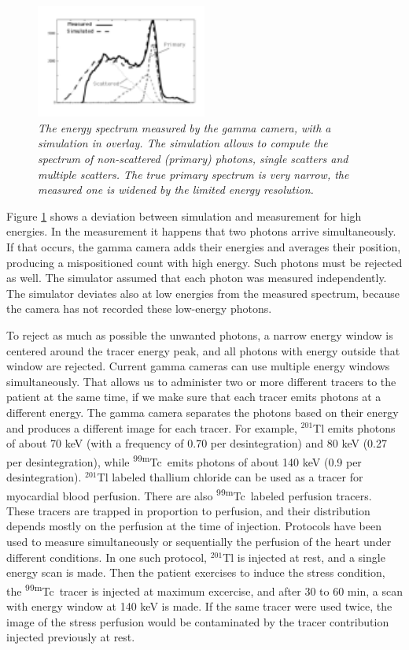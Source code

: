 \documentclass[11pt,oneside]{book}
\begin{document}
\begin{figure}[tb]
\centering
\includegraphics[width=0.5\textwidth]{figs/fig_scatter_spectrum.pdf}
\caption{\label{fig:scatter_spectrum} \emph{The energy spectrum measured by
the gamma camera, with a simulation in overlay. The simulation allows to
compute the spectrum of non-scattered (primary) photons, single scatters and
multiple scatters. The true primary spectrum is very narrow, the measured one
is widened by the limited energy resolution.}}
\end{figure}

Figure \ref{fig:scatter_spectrum} shows a deviation between simulation and
measurement for high energies. In the measurement it happens that two photons
arrive simultaneously. If that occurs, the gamma camera adds their energies
and averages their position, producing a mispositioned count with high
energy. Such photons must be rejected as well. The simulator assumed
that each photon was measured independently. The simulator deviates also at
low energies from the measured spectrum, because the camera has not recorded
these low-energy photons.

To reject as much as possible the unwanted photons, a narrow energy
window is centered around the tracer energy peak, and all photons with
energy outside that window are rejected. Current gamma cameras can use
multiple energy windows simultaneously. That allows us to administer
two or more different tracers to the patient at the same time, if we
make sure that each tracer emits photons at a different energy. The
gamma camera separates the photons based on their energy and produces
a different image for each tracer. For example, $^{201}$Tl emits
photons of about 70 keV (with a frequency of 0.70 per desintegration)
and 80 keV (0.27 per desintegration), while \textsuperscript{99m}Tc\ emits photons
of about 140 keV (0.9 per desintegration). $^{201}$Tl labeled thallium
chloride can be used as a tracer for myocardial blood perfusion. There
are also \textsuperscript{99m}Tc\ labeled perfusion tracers. These tracers are
trapped in proportion to perfusion, and their distribution depends
mostly on the perfusion at the time of injection.  Protocols have been
used to measure simultaneously or sequentially the perfusion of the
heart under different conditions. In one such protocol, $^{201}$Tl is
injected at rest, and a single energy scan is made. Then the patient
exercises to induce the stress condition, the \textsuperscript{99m}Tc\ tracer is
injected at maximum excercise, and after 30 to 60 min, a scan with
energy window at 140 keV is made. If the same tracer were used twice,
the image of the stress perfusion would be contaminated by the tracer
contribution injected previously at rest.
\end{document}
